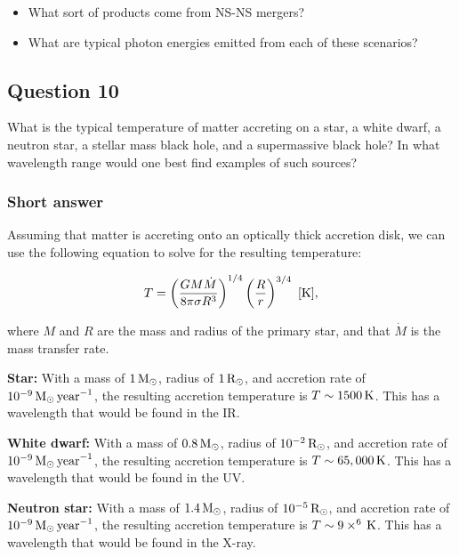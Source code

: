 \documentclass[a4paper,10pt]{article}
\begin{document}
\begin{itemize}
    \item What sort of products come from NS-NS mergers?
    \item What are typical photon energies emitted from each of these scenarios?
\end{itemize}


\newpage
\subsection{Question 10}

What is the typical temperature of matter accreting on a star, a white dwarf, a neutron star, a stellar mass black hole, and a supermassive black hole? In what wavelength range would one best find examples of such sources?

\subsubsection{Short answer}

Assuming that matter is accreting onto an optically thick accretion disk, we can use the following equation to solve for the resulting temperature:

\begin{align*}
T = \left(\frac{GM\dot{M}}{8\pi\sigma R^3}\right)^{1/4} \left(\frac{R}{r}\right)^{3/4} ~ [{\rm K}],
\end{align*}

{\noindent}where $M$ and $R$ are the mass and radius of the primary star, and that $\dot{M}$ is the mass transfer rate.

{\noindent}\textbf{Star:} With a mass of $1\,{\rm M_\odot}$, radius of $1\,{\rm R_\odot}$, and accretion rate of $10^{-9}\,{\rm M_\odot\,year}^{-1}$, the resulting accretion temperature is $T\sim1500\,{\rm K}$. This has a wavelength that would be found in the IR.

{\noindent}\textbf{White dwarf:} With a mass of $0.8\,{\rm M_\odot}$, radius of $10^{-2}\,{\rm R_\odot}$, and accretion rate of $10^{-9}\,{\rm M_\odot\,year}^{-1}$, the resulting accretion temperature is $T\sim65,000\,{\rm K}$. This has a wavelength that would be found in the UV.

{\noindent}\textbf{Neutron star:} With a mass of $1.4\,{\rm M_\odot}$, radius of $10^{-5}\,{\rm R_\odot}$, and accretion rate of $10^{-9}\,{\rm M_\odot\,year}^{-1}$, the resulting accretion temperature is $T\sim9\times^6\,{\rm K}$. This has a wavelength that would be found in the X-ray.
\end{document}
